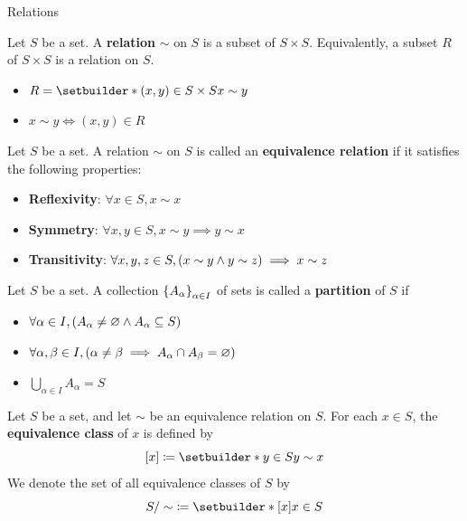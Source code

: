 \begin{section}{Relations}

Let $S$ be a set. A \textbf{relation} $\sim$ on $S$ is a subset of $S \times S$.
Equivalently, a subset $R$ of $S \times S$ is a relation on $S$.
\begin{itemize}
    \item $R = \setbuilder*{(x, y) \in S \times S}{x \sim y}$
    \item $x \sim y \iff (x, y) \in R$
\end{itemize}

\bigskip

\begin{definition} \label{def:EquivalenceRelation}
    Let $S$ be a set. A relation $\sim$ on $S$ is called an \textbf{equivalence relation} if it satisfies the following properties:
    \begin{itemize}
        \item \textbf{Reflexivity}: $\forall x \in S, x \sim x$
        \item \textbf{Symmetry}: $\forall x, y \in S, x \sim y \implies y \sim x$
        \item \textbf{Transitivity}: $\forall x, y, z \in S, \paren*{x \sim y \land y \sim z} \implies x \sim z$
    \end{itemize}
\end{definition}

\bigskip

\begin{definition} \label{def:Partition}
    Let $S$ be a set. A collection $\set*{A_{\alpha}}_{\alpha \in I}$ of sets is called a \textbf{partition} of $S$ if
    \begin{itemize}
        \item $\forall \alpha \in I, \paren*{A_{\alpha} \neq \vnot \land A_{\alpha} \subseteq S}$
        \item $\forall \alpha, \beta \in I, \paren*{\alpha \neq \beta \implies A_{\alpha} \cap A_{\beta} = \vnot}$
        \item $\displaystyle \bigcup_{\alpha \in I} A_{\alpha} = S$
    \end{itemize}
\end{definition}

\bigskip

\begin{definition} \label{def:EquivalenceClass}
    Let $S$ be a set, and let $\sim$ be an equivalence relation on $S$. For each $x \in S$,
    the \textbf{equivalence class} of $x$ is defined by
    \[
    [x] \coloneqq \setbuilder*{y \in S}{y \sim x}
    \]
    We denote the set of all equivalence classes of $S$ by
    \[
    S / \sim \; \coloneqq \setbuilder*{[x]}{x \in S}
    \]
\end{definition}


\end{section}

